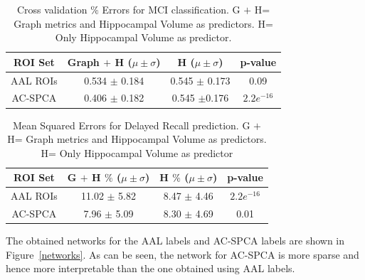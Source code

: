 \documentclass{llncs}
\begin{document}
\begin{table}
\begin{center}
\begin{small}
\begin{tabular}{|c|c|c|c|}
\hline
 ROI Set& Graph $+$ H  ($\mu\pm\sigma$) & H  ($\mu\pm\sigma$) & p-value  \\
\hline
AAL ROIs & 0.534 $\pm$ 0.184 &0.545 $\pm$ 0.173  &0.09\\
AC-SPCA &  0.406 $\pm$ 0.182  &   0.545 $\pm $0.176 & $2.2e^{-16}$\\
   \hline
\end{tabular}
\end{small}
\vspace{0.1in}
\caption{Cross validation $\%$ Errors for MCI classification. G $+$ H= Graph metrics and Hippocampal Volume as predictors. H= Only Hippocampal Volume as predictor. }
\end{center}
\end{table}


\begin{table}
\begin{center}
\begin{small}
\begin{tabular}{|c|c|c|c|}
\hline
 ROI Set& G $+$ H $\%$ ($\mu\pm\sigma$) & H  $\%$ ($\mu\pm\sigma$) & p-value  \\
\hline
AAL ROIs & 11.02 $\pm$ 5.82 &   8.47 $\pm $ 4.46 & $2.2e^{-16}$\\
AC-SPCA &  7.96 $\pm$ 5.09 & 8.30 $\pm$ 4.69    & 0.01 \\
   \hline
\end{tabular}
\end{small}
\vspace{0.1in}
\caption{Mean Squared Errors for Delayed Recall prediction.  G $+$ H= Graph metrics and Hippocampal Volume as predictors. H= Only Hippocampal Volume as predictor }
\end{center}
\end{table}


The obtained networks for the AAL labels and AC-SPCA labels are shown in Figure~\ref{networks}. As can be seen, the network for AC-SPCA is more sparse and hence more interpretable than the one obtained using AAL labels.  
\end{document}
